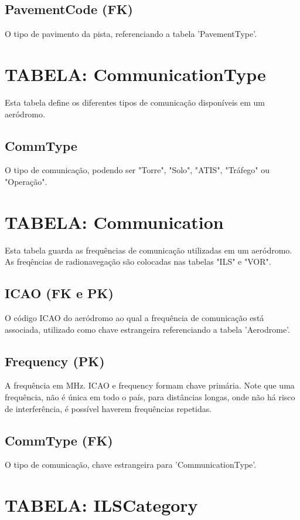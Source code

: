 \subsection{PavementCode (FK)}

O tipo de pavimento da pista, referenciando a tabela 'PavementType'.


\section{TABELA: CommunicationType}

Esta tabela define os diferentes tipos de comunicação disponíveis em um aeródromo.

\subsection{CommType}
O tipo de comunicação, podendo ser "Torre", "Solo", "ATIS", "Tráfego" ou "Operação".


\section{TABELA: Communication}

Esta tabela guarda as frequências de comunicação utilizadas em um aeródromo. As 
freqências de radionavegação são colocadas nas tabelas "ILS" e "VOR".

\subsection{ICAO (FK e PK)}
O código ICAO do aeródromo ao qual a frequência de comunicação está associada, utilizado 
como chave estrangeira referenciando a tabela 'Aerodrome'.

\subsection{Frequency (PK)}
A frequência em MHz. ICAO e frequency formam chave primária. Note que uma frequência,
não é única em todo o país, para distâncias longas, onde não há risco de interferência,
é possível haverem frequências repetidas.

\subsection{CommType (FK)}
O tipo de comunicação, chave estrangeira para 'CommunicationType'.


\section{TABELA: ILSCategory}

